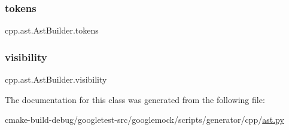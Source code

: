 \mbox{\label{classcpp_1_1ast_1_1AstBuilder_a1b21f8bef712e91862ccb6b1147cab0d}} 
\subsubsection{\texorpdfstring{tokens}{tokens}}
{\footnotesize\ttfamily cpp.\+ast.\+Ast\+Builder.\+tokens}

\mbox{\label{classcpp_1_1ast_1_1AstBuilder_a2f16b19846c405101235432d2666b614}} 
\subsubsection{\texorpdfstring{visibility}{visibility}}
{\footnotesize\ttfamily cpp.\+ast.\+Ast\+Builder.\+visibility}



The documentation for this class was generated from the following file\+:\begin{DoxyCompactItemize}
\item 
cmake-\/build-\/debug/googletest-\/src/googlemock/scripts/generator/cpp/\mbox{\hyperlink{ast_8py}{ast.\+py}}\end{DoxyCompactItemize}
